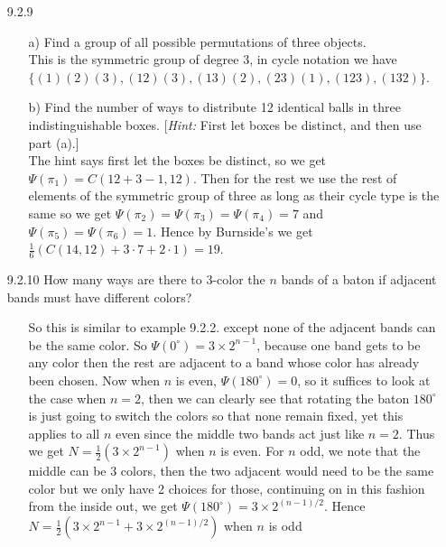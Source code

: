 \documentclass[12pt]{article}
\begin{document}
\begin{enumerate}
\item[9.2.9] 
\begin{enumerate}
\item[a)] Find a group of all possible permutations of three objects. \\
This is the symmetric group of degree 3, in cycle notation we have \\
$\{(1)(2)(3), (12)(3), (13)(2), (23)(1), (123), (132) \}$.
\item[b)] Find the number of ways to distribute 12 identical balls in three indistinguishable boxes. [\emph{Hint:} First let boxes be distinct, and then use part (a).] \\
The hint says first let the boxes be distinct, so we get $\Psi(\pi_1) = 
C(12+3-1, 12)$. Then for the rest we use the rest of elements of the symmetric group
of three as long as their cycle type is the same so we get $\Psi(\pi_2) = \Psi(\pi_3) = 
\Psi(\pi_4) = 7$ and $\Psi(\pi_5) = \Psi(\pi_6) = 1$. Hence by Burnside's we get
$\frac{1}{6}(C(14, 12) + 3 \cdot 7 + 2 \cdot 1) = 19$.
\end{enumerate}

\item[9.2.10] How many ways are there to 3-color the $n$ bands of a baton if adjacent bands must have different colors?
\begin{enumerate}
\item[] So this is similar to example 9.2.2. except none of the adjacent bands can be 
the same color. So $\Psi(0^{\circ}) = 3 \times 2^{n-1}$, because one band gets to be
any color then the rest are adjacent to a band whose color has already been chosen. Now
when $n$ is even, $\Psi(180^{\circ}) = 0$, so it suffices to look at the case when 
$n = 2$, then we can clearly see that rotating the baton $180^{\circ}$ is just going
to switch the colors so that none remain fixed, yet this applies to all $n$ even since
the middle two bands act just like $n = 2$. Thus we get $N = \frac{1}{2}(3 \times 2^{n-1})$
when $n$ is even. For $n$ odd, we note that the middle can be 3 colors, then the two
adjacent would need to be the same color but we only have 2 choices for those, continuing
on in this fashion from the inside out, we get $\Psi(180^{\circ}) = 3 \times 2^{(n-1)/2}$.
Hence $N = \frac{1}{2}(3 \times 2^{n-1} + 3 \times 2^{(n-1)/2})$ when $n$ is odd
\end{enumerate}


\end{enumerate}
\end{document}
